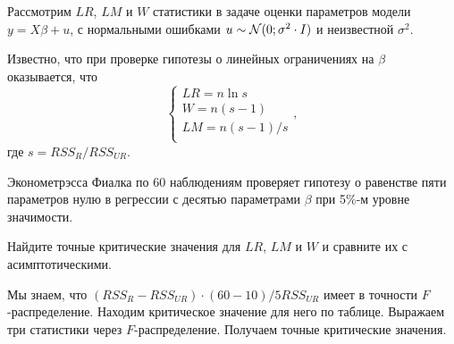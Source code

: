 \begin{problem}
Рассмотрим $LR$, $LM$ и $W$ статистики в задаче оценки параметров модели $y=X\beta + u$, с нормальными ошибками $u\sim \mathcal{N}(0;\sigma^2 \cdot I)$ и неизвестной $\sigma^2$.

Известно, что при проверке гипотезы о линейных ограничениях на $\beta$ оказывается, что
\[
\begin{cases}
   LR = n \ln s \\
   W = n (s - 1) \\
   LM = n(s-1)/s \\
\end{cases},
\]
где $s = RSS_R / RSS_{UR}$.

Эконометрэсса Фиалка по 60 наблюдениям проверяет гипотезу о равенстве пяти параметров нулю
в регрессии с десятью параметрами $\beta$ при 5\%-м уровне значимости.

Найдите точные критические значения для $LR$, $LM$ и $W$ и сравните их с асимптотическими.

  \begin{sol}
      Мы знаем, что $(RSS_R - RSS_{UR}) \cdot (60 - 10) / 5 RSS_{UR}$ имеет в точности $F$-распределение.
      Находим критическое значение для него по таблице. Выражаем три статистики через $F$-распределение.
      Получаем точные критические значения.
  \end{sol}
\end{problem}







\section{}


